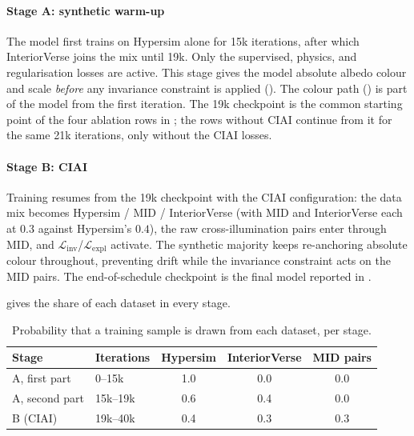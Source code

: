 \paragraph{Stage A: synthetic warm-up}
The model first trains on Hypersim alone for 15k iterations, after which InteriorVerse
joins the mix until 19k.
Only the supervised, physics, and regularisation losses are active.
This stage gives the model absolute albedo colour and scale \emph{before} any
invariance constraint is applied ().
The colour path () is part of the model from the first
iteration. The 19k checkpoint is the common starting point of the four ablation rows in
; the rows without CIAI continue from it for the same 21k iterations,
only without the CIAI losses.

\paragraph{Stage B: CIAI}
Training resumes from the 19k checkpoint with the CIAI configuration: the
data mix becomes Hypersim / MID / InteriorVerse (with MID and InteriorVerse
each at $0.3$ against Hypersim's $0.4$), the raw cross-illumination pairs enter
through MID, and $\mathcal{L}_{\text{inv}}$/$\mathcal{L}_{\text{expl}}$
activate.
The synthetic majority keeps re-anchoring absolute colour throughout,
preventing drift while the invariance constraint acts on the MID pairs.
The end-of-schedule checkpoint is the final model reported in
.

 gives the share of each dataset in every stage.

\begin{table}[t!]
  \caption[Dataset sampling weights per training stage.]{%
    Probability that a training sample is drawn from each dataset, per stage.}
  \label{tab:sampling}
  \centering
  \small
  \begin{tabular}{@{}llccc@{}}
    \toprule
    Stage & Iterations & Hypersim & InteriorVerse & MID pairs \\
    \midrule
    A, first part  & 0--15k  & 1.0 & 0.0 & 0.0 \\
    A, second part & 15k--19k & 0.6 & 0.4 & 0.0 \\
    B (CIAI)       & 19k--40k & 0.4 & 0.3 & 0.3 \\
    \bottomrule
  \end{tabular}
\end{table}

